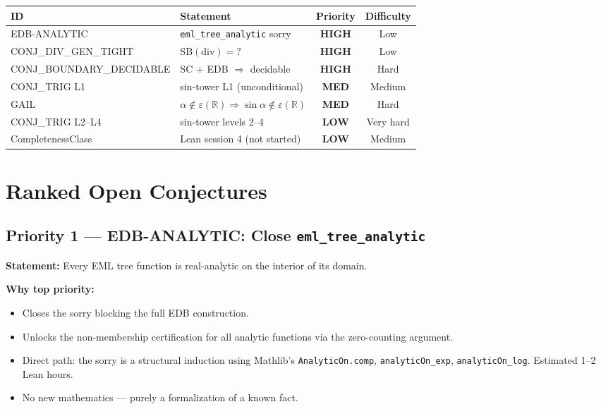 \documentclass[12pt]{article}
\theoremstyle{definition}
\begin{document}
\begin{center}
\begin{tabular}{llcc}
\toprule
ID & Statement & Priority & Difficulty \\
\midrule
EDB-ANALYTIC & \texttt{eml\_tree\_analytic} sorry & \textcolor{high}{\textbf{HIGH}} & Low \\
CONJ\_DIV\_GEN\_TIGHT & $\mathrm{SB}(\mathrm{div}) = ?$ & \textcolor{high}{\textbf{HIGH}} & Low \\
CONJ\_BOUNDARY\_DECIDABLE & SC + EDB $\Rightarrow$ decidable & \textcolor{high}{\textbf{HIGH}} & Hard \\
CONJ\_TRIG L1 & sin-tower L1 (unconditional) & \textcolor{med}{\textbf{MED}} & Medium \\
GAIL & $\alpha \notin \varepsilon(\mathbb{R}) \Rightarrow \sin\alpha \notin \varepsilon(\mathbb{R})$ & \textcolor{med}{\textbf{MED}} & Hard \\
CONJ\_TRIG L2–L4 & sin-tower levels 2–4 & \textcolor{low}{\textbf{LOW}} & Very hard \\
CompletenessClass & Lean session 4 (not started) & \textcolor{low}{\textbf{LOW}} & Medium \\
\bottomrule
\end{tabular}
\end{center}

\section{Ranked Open Conjectures}

\subsection{Priority 1 — EDB-ANALYTIC: Close \texttt{eml\_tree\_analytic}}
\label{sec:p1}

\textbf{Statement:} Every EML tree function is real-analytic on the interior of its
domain.

\textbf{Why top priority:}
\begin{itemize}[noitemsep]
  \item Closes the sorry blocking the full EDB construction.
  \item Unlocks the non-membership certification for all analytic functions via
    the zero-counting argument.
  \item Direct path: the sorry is a structural induction using
    Mathlib's \texttt{AnalyticOn.comp}, \texttt{analyticOn\_exp},
    \texttt{analyticOn\_log}.  Estimated 1–2 Lean hours.
  \item No new mathematics — purely a formalization of a known fact.
\end{itemize}
\end{document}
